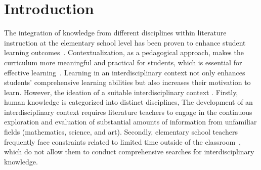 \section{Introduction}

The integration of knowledge from different disciplines within literature instruction at the elementary school level 
has been proven to enhance student learning outcomes~\cite{navrotskaya2024reading, lindvig2019different}. 
Contextualization, as a pedagogical approach, makes the curriculum more meaningful and practical for students, which is essential for effective learning~\cite{fernandes2013curricular}. Learning in an interdisciplinary context not only enhances students' comprehensive learning abilities but also increases their motivation to learn. 
However, the ideation of a suitable interdisciplinary context . %
Firstly, human knowledge is categorized into distinct disciplines,  
The development of an interdisciplinary context requires literature teachers to engage in the continuous exploration and evaluation of substantial amounts of information from unfamiliar fields (\eg mathematics, science, and art).
Secondly, elementary school teachers frequently face constraints related to limited time outside of the classroom~\cite{dias2017challenges}, which do not allow them to conduct comprehensive searches for interdisciplinary knowledge. 

